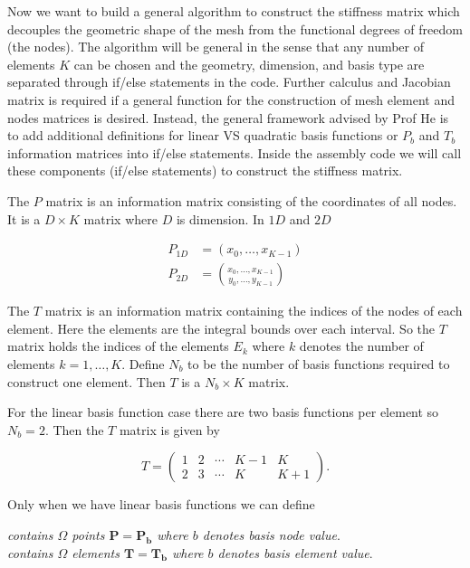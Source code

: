 \documentclass[12pt, oneside]{book}
\begin{document}
Now we want to build a general algorithm to construct the stiffness matrix which decouples the geometric 
shape of the mesh from the functional degrees of freedom (the nodes). The algorithm will be general in the 
sense that any number of elements $K$ can be chosen and the geometry, dimension, and basis type are separated through 
if/else statements in the code. Further calculus and Jacobian matrix is required if a general function for the 
construction of mesh element and nodes matrices is desired. Instead, the general framework advised by Prof He is to 
add additional definitions for linear VS quadratic basis functions or $P_b$ and $T_b$ information matrices into if/else 
statements. Inside the assembly code we will call these components (if/else statements) to construct the stiffness matrix.
\par The $P$ matrix is an information matrix consisting of the coordinates of all nodes. It is a $D \times K$ matrix 
where $D$ is dimension. In $1 D$ and $2 D$

$$
\begin{aligned}
P_{1 D} & =\left(x_{0}, \ldots, x_{K-1}\right) \\
P_{2 D} & =\binom{x_{0}, \ldots, x_{K-1}}{y_{0}, \ldots, y_{K-1}}
\end{aligned}
$$

The $T$ matrix is an information matrix containing the indices of the nodes of each element. 
Here the elements are the integral bounds over each interval. So the $T$ matrix holds the indices 
of the elements $E_{k}$ where $k$ denotes the number of elements $k=1, \ldots, K$. 
Define $N_b$ to be the number of basis functions required to construct one element. Then $T$ is a $N_b \times K$ matrix. 
\par For the linear basis function case there are two basis functions per element so $N_b=2$. 
Then the $T$ matrix is given by

$$
T=\left(\begin{array}{lllll}
1 & 2 & \cdots & K-1 & K \\
2 & 3 & \cdots & K & K+1 
\end{array}\right). 
$$

Only when we have linear basis functions we can define

\begin{center}
  \textit{contains $\Omega$ points $\mathbf{P=P_{b}}$ where $b$ denotes basis node value}. \\
  \textit{contains $\Omega$ elements $\mathbf{T=T_{b}}$ where $b$ denotes basis element value}.
\end{center}
\end{document}
